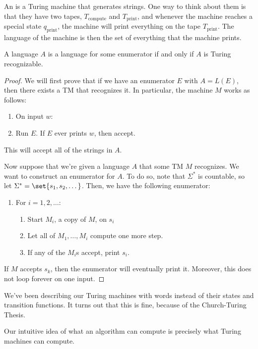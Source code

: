 \documentclass{standalone}
\begin{document}
\begin{definition}
  An  is a Turing machine that generates strings.
  One way to think about them is that they have two tapes,
  \(T_{\text{compute}}\) and \(T_{\text{print}}\),
  and whenever the machine reaches a special state \(q_{\text{print}}\),
  the machine will print everything on the tape \(T_{\text{print}}\).
  The language of the machine is then
  the set of everything that the machine prints.
\end{definition}

\begin{proposition}
  A language \(A\) is a language for some enumerator
  if and only if \(A\) is Turing recognizable.
\end{proposition}
\begin{proof}
  We will first prove that if we have an enumerator \(E\) with \(A = L(E)\),
  then there exists a \textsf{TM} that recognizes it.
  In particular, the machine \(M\) works as follows:
  \begin{enumerate}[nosep, start=0]
    \item On input \(w\):
    \item Run \(E\). If \(E\) ever prints \(w\), then accept.
  \end{enumerate}
  This will accept all of the strings in \(A\).

  Now suppose that we're given a language \(A\)
  that some \textsf{TM} \(M\) recognizes.
  We want to construct an enumerator for \(A\).
  To do so, note that \(\Sigma^*\) is countable,
  so let \(\Sigma^* = \set{s_1, s_2, \dots}\).
  Then, we have the following enumerator:
  \begin{enumerate}[nosep]
    \item For \(i = 1, 2, \dots\):
    \begin{enumerate}[nosep]
      \item Start \(M_i\), a copy of \(M\), on \(s_i\)
      \item Let all of \(M_1, \dots, M_i\) compute one more step.
      \item If any of the \(M_i\)s accept, print \(s_i\).
    \end{enumerate}
  \end{enumerate}
  If \(M\) accepts \(s_k\), then the enumerator will eventually print it.
  Moreover, this does not loop forever on one input.
\end{proof}

We've been describing our Turing machines with words
instead of their states and transition functions.
It turns out that this is fine, because of the Church-Turing Thesis.
\begin{claim}
  Our intuitive idea of what an algorithm can compute
  is precisely what Turing machines can compute.
\end{claim}
\end{document}
